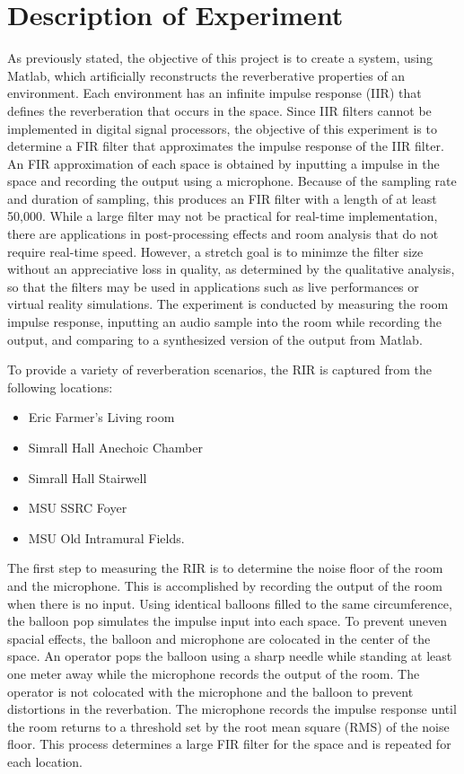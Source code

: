 \documentclass[letterpaper, 11pt, onecolumn, oneside]{article}
\begin{document}
\section*{Description of Experiment}
As previously stated, the objective of this project is to create a system,
using Matlab, which artificially reconstructs the reverberative properties of
an environment. Each environment has an infinite impulse response (IIR) that
defines the reverberation that occurs in the space. Since IIR filters cannot be
implemented in digital signal processors, the objective of this experiment is
to determine a FIR filter that approximates the impulse response of the IIR
filter. An FIR approximation of each space is obtained by inputting a impulse
in the space and recording the output using a microphone. Because of the
sampling rate and duration of sampling, this produces an FIR filter with a
length of at least 50,000. While a large filter may not be practical for
real-time implementation, there are applications in post-processing effects and
room analysis that do not require real-time speed. However, a stretch goal is
to minimze the filter size without an appreciative loss in quality, as
determined by the qualitative analysis, so that the filters may be used in
applications such as live performances or virtual reality simulations. The
experiment is conducted by measuring the room impulse response, inputting
an audio sample into the room while recording the output, and comparing to a
synthesized version of the output from Matlab.

To provide a variety of reverberation scenarios, the RIR is captured from the
following locations:

\begin{itemize}
    \item Eric Farmer's Living room
    \item Simrall Hall Anechoic Chamber
    \item Simrall Hall Stairwell
    \item MSU SSRC Foyer
    \item MSU Old Intramural Fields.
\end{itemize}

The first step to measuring the RIR is to determine the noise floor of the room
and the microphone. This is accomplished by recording the output of the room
when there is no input. Using identical balloons filled to the same
circumference, the balloon pop simulates the impulse input into each space.
To prevent uneven spacial effects, the balloon and microphone are colocated in
the center of the space. An operator pops the balloon using a sharp needle
while standing at least one meter away while the microphone records the output
of the room. The operator is not colocated with the microphone and the balloon
to prevent distortions in the reverbation. The microphone records the impulse
response until the room returns to a threshold set by the root mean square (RMS)
of the noise floor. This process determines a large FIR filter for the space
and is repeated for each location.
\end{document}
